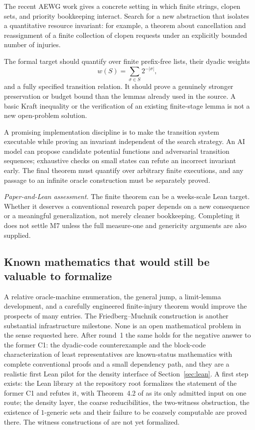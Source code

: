 \documentclass[11pt,a4paper]{article}
\newcommand{\assessment}[1]{\par\noindent\textit{Paper-and-Lean assessment.} #1\par}
\theoremstyle{definition}\newtheorem{definition}[theorem]{Definition}
\theoremstyle{remark}\newtheorem{remark}[theorem]{Remark}
\begin{document}
The recent AEWG work gives a concrete setting in which finite strings, clopen sets, and priority bookkeeping interact.\cite{Zhao} Search for a new abstraction that isolates a quantitative resource invariant: for example, a theorem about cancellation and reassignment of a finite collection of clopen requests under an explicitly bounded number of injuries.

The formal target should quantify over finite prefix-free lists, their dyadic weights
\[
 w(S)=\sum_{\sigma\in S}2^{-|\sigma|},
\]
and a fully specified transition relation. It should prove a genuinely stronger preservation or budget bound than the lemmas already used in the source. A basic Kraft inequality or the verification of an existing finite-stage lemma is not a new open-problem solution.

A promising implementation discipline is to make the transition system executable while proving an invariant independent of the search strategy. An AI model can propose candidate potential functions and adversarial transition sequences; exhaustive checks on small states can refute an incorrect invariant early. The final theorem must quantify over arbitrary finite executions, and any passage to an infinite oracle construction must be separately proved.

\assessment{The finite theorem can be a weeks-scale Lean target. Whether it deserves a conventional research paper depends on a new consequence or a meaningful generalization, not merely cleaner bookkeeping. Completing it does not settle M7 unless the full measure-one and genericity arguments are also supplied.}

\subsection{Known mathematics that would still be valuable to formalize}

A relative oracle-machine enumeration, the general jump, a limit-lemma development, and a carefully engineered finite-injury theorem would improve the prospects of many entries. The Friedberg--Muchnik construction is another substantial infrastructure milestone. None is an open mathematical problem in the sense requested here. After round~1 the same holds for the negative answer to the former C1: the dyadic-code counterexample and the block-code characterization of least representatives \cite{Synthesis} are known-status mathematics with complete conventional proofs and a small dependency path, and they are a realistic first Lean pilot for the density interface of Section~\ref{sec:lean}. A first step exists: the Lean library  at the repository root formalizes the statement of the former C1 and refutes it, with Theorem~4.2 of \cite{HJKS} as its only admitted input on one route; the density layer, the coarse reducibilities, the two-witness obstruction, the existence of $1$-generic sets and their failure to be coarsely computable are proved there. The witness constructions of \cite{Synthesis} are not yet formalized.
\end{document}
